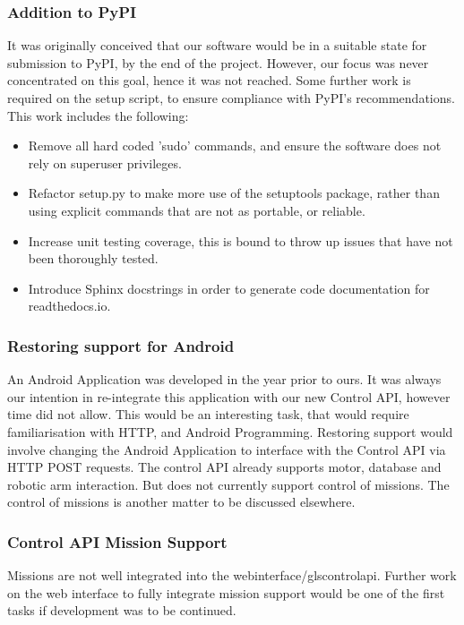 \subsubsection{Addition to PyPI}
It was originally conceived that our software would be in a suitable state for submission to \gls{PyPI}, by the end of the project. However, our focus was never concentrated on this goal, hence it was not reached. Some further work is required on the setup script, to ensure compliance with \gls{PyPI}'s recommendations.
This work includes the following:
\begin{itemize}
\item Remove all hard coded 'sudo' commands, and ensure the software does not rely on superuser privileges.
\item Refactor setup.py to make more use of the setuptools package, rather than using explicit commands that are not as portable, or reliable.
\item Increase unit testing coverage, this is bound to throw up issues that have not been thoroughly tested.
\item Introduce Sphinx docstrings in order to generate code documentation for readthedocs.io.
\end{itemize}

\subsubsection{Restoring support for Android}
An Android Application was developed in the year prior to ours. It was always our intention in re-integrate this application with our new Control API, however time did not allow. This would be an interesting task, that would require familiarisation with HTTP, and Android Programming.
\newline
Restoring support would involve changing the Android Application to interface with the Control API via \gls{HTTP} \gls{POST} requests. The control API already supports motor, database and robotic arm interaction. But does not currently support control of missions. The control of missions is another matter to be discussed elsewhere.

\subsubsection{Control API Mission Support}
Missions are not well integrated into the \gls{webinterface}/gls{controlapi}. Further work on the web interface to fully integrate mission support would be one of the first tasks if development was to be continued.

